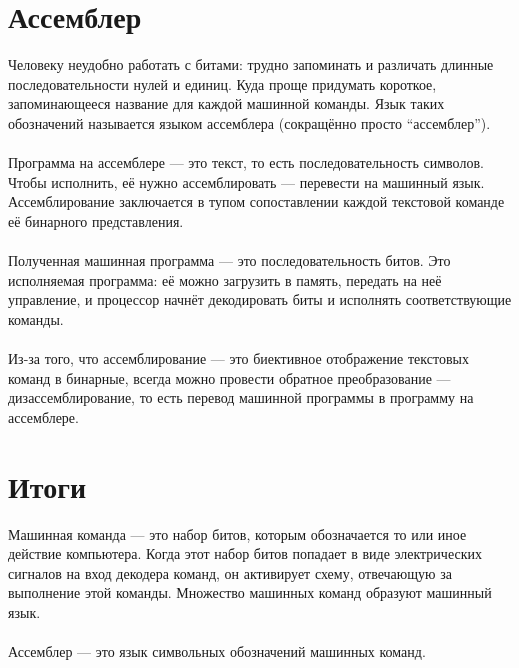 \documentclass[11pt]{book}
\begin{document}
\section{Ассемблер}
Человеку неудобно работать с битами: трудно запоминать и различать длинные последовательности нулей и единиц.
Куда проще придумать короткое, запоминающееся название для каждой машинной команды.
Язык таких обозначений называется языком ассемблера (сокращённо просто ``ассемблер'').
\\ \\
Программа на ассемблере --- это текст, то есть последовательность символов.
Чтобы исполнить, её нужно ассемблировать --- перевести на машинный язык.
Ассемблирование заключается в тупом сопоставлении каждой текстовой команде её бинарного представления.
\\ \\
Полученная машинная программа --- это последовательность битов.
Это исполняемая программа: её можно загрузить в память, передать на неё управление,
и процессор начнёт декодировать биты и исполнять соответствующие команды.
\\ \\
Из-за того, что ассемблирование --- это биективное отображение текстовых команд в бинарные,
всегда можно провести обратное преобразование --- дизассемблирование,
то есть перевод машинной программы в программу на ассемблере.

\section{Итоги}
Машинная команда --- это набор битов, которым обозначается то или иное действие компьютера.
Когда этот набор битов попадает в виде электрических сигналов на вход декодера команд,
он активирует схему, отвечающую за выполнение этой команды.
Множество машинных команд образуют машинный язык.
\\ \\
Ассемблер --- это язык символьных обозначений машинных команд.
\end{document}
